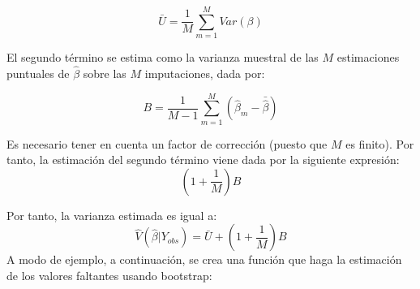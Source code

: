 \documentclass[
  12pt,
]{book}
\begin{document}
\[\bar{U} = \frac{1}{M} \sum_{m = 1} ^ M Var(\beta)\]

El segundo término se estima como la varianza muestral de las \(M\) estimaciones
puntuales de \(\hat{\beta}\) sobre las \(M\) imputaciones, dada por:

\[B = \frac{1}{M-1} \sum_{m = 1} ^ M (\hat{\beta}_m - \bar{\hat{\beta}})\]

Es necesario tener en cuenta un factor de corrección (puesto que \(M\) es finito).
Por tanto, la estimación del segundo término viene dada por la siguiente
expresión:
\[
(1 + \frac{1}{M}) B
\]

Por tanto, la varianza estimada es igual a:
\[\hat{V}(\hat{\beta} | Y_{obs}) = \bar{U} + (1 + \frac{1}{M}) B\]
A modo de ejemplo, a continuación, se crea una función que haga la estimación de los valores faltantes usando bootstrap:
\end{document}
